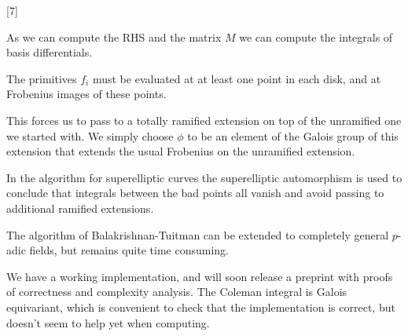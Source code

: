 \documentclass[oneside,11pt,]{article}
\let\emph\relax %
\begin{document}
   [7]

As we can compute the RHS and the matrix $M$ we can compute the integrals of basis differentials.

The primitives $f_i$ must be evaluated at at least one point in each disk, and at Frobenius images of these points.

This forces us to pass to a totally ramified extension on top of the unramified one we started with.
We simply choose $\phi$ to be an element of the Galois group of this extension that extends the usual Frobenius on the unramified extension.

In the algorithm for superelliptic curves the superelliptic automorphism is used to conclude that integrals between the bad points all vanish and avoid passing to additional ramified extensions.


\emph{Conclusion:} The algorithm of Balakrishnan-Tuitman can be extended to completely general $p$-adic fields, but remains quite time consuming.

We have a working implementation, and will soon release a preprint with proofs of correctness and complexity analysis.
The Coleman integral is Galois equivariant, which is convenient to check that the implementation is correct, but doesn't seem to help yet when computing.
\end{document}
